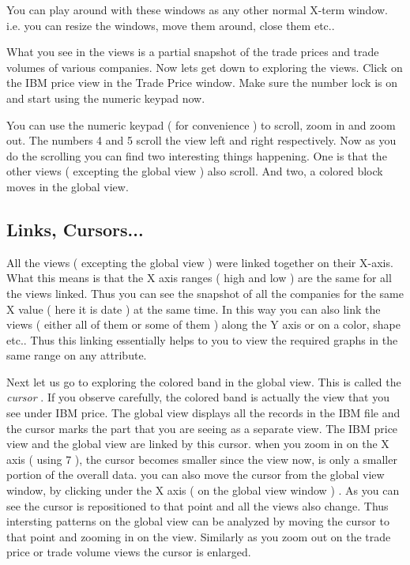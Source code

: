 	You can play around with these windows as any other normal X-term window. i.e. you can resize the windows, move them around, close them etc..


	What you see in the views is a partial snapshot of the trade prices and trade volumes of various companies. Now lets get down to exploring the views. Click on the IBM price view in the Trade Price window. Make sure the number lock is on and start using the numeric keypad now.


	You can use the numeric keypad ( for convenience ) to scroll, zoom in and zoom out. The numbers 4 and 5 scroll the view left and right respectively. Now as you do the scrolling you can find two interesting things happening. One is that the other views ( excepting the global view ) also scroll. And two, a colored block moves in the global view.

\subsection{Links, Cursors...}


	All the views ( excepting the global view ) were linked together on their X-axis. What this means is that the X axis ranges ( high and low ) are the same for all the views linked. Thus you can see the snapshot of all the companies for the same X value ( here it is date ) at the same time. In this way you can also link the views ( either all of them or some of them ) along the Y axis or on a color, shape etc.. Thus this linking essentially helps to you to view the required graphs in the same range on any attribute.

	Next let us go to exploring the colored band in the global view. This is called the {\em cursor }. If you observe carefully, the colored band is actually the view that you see under IBM price. The global view displays all the records in the IBM file and the cursor marks the part that you are seeing as a separate view. The IBM price view and the global view are linked by this cursor. when you zoom in on the X axis ( using 7 ), the cursor becomes smaller since the view now, is only a smaller portion of the overall data. you can also move the cursor from the global view window, by clicking under the X axis ( on the global view window ) . As you can see the cursor is repositioned to that point and all the views also change. Thus intersting patterns on the global view can be analyzed by moving the cursor to that point and zooming in on the view. Similarly as you zoom out on the trade price or trade volume views the cursor is enlarged.


